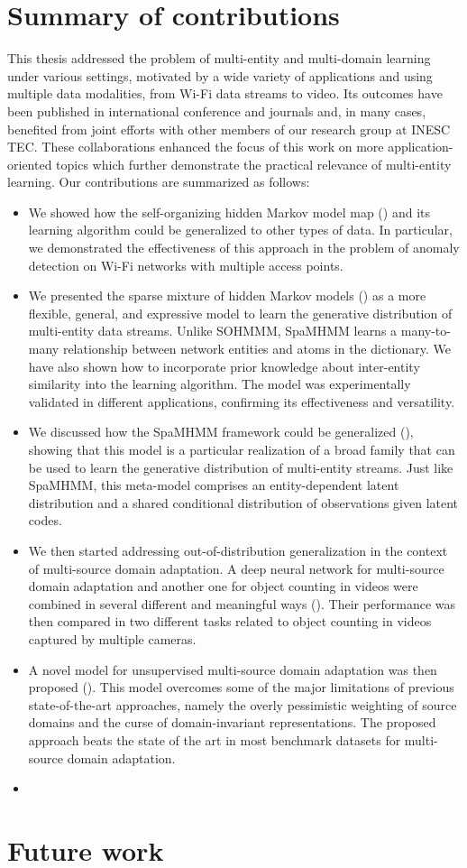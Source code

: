 \section{Summary of contributions}
This thesis addressed the problem of multi-entity and multi-domain learning under various settings, motivated by a wide variety of applications and using multiple data modalities, from Wi-Fi data streams to video. Its outcomes have been published in international conference and journals and, in many cases, benefited from joint efforts with other members of our research group at INESC TEC. These collaborations enhanced the focus of this work on more application-oriented topics which further demonstrate the practical relevance of multi-entity learning. Our contributions are summarized as follows:
\begin{itemize}
    \item We showed how the self-organizing hidden Markov model map () and its learning algorithm could be generalized to other types of data. In particular, we demonstrated the effectiveness of this approach in the problem of anomaly detection on Wi-Fi networks with multiple access points.
    \item We presented the sparse mixture of hidden Markov models () as a more flexible, general, and expressive model to learn the generative distribution of multi-entity data streams. Unlike SOHMMM, SpaMHMM learns a many-to-many relationship between network entities and atoms in the dictionary. We have also shown how to incorporate prior knowledge about inter-entity similarity into the learning algorithm. The model was experimentally validated in different applications, confirming its effectiveness and versatility.
    \item We discussed how the SpaMHMM framework could be generalized (), showing that this model is a particular realization of a broad family that can be used to learn the generative distribution of multi-entity streams. Just like SpaMHMM, this meta-model comprises an entity-dependent latent distribution and a shared conditional distribution of observations given latent codes.
    \item We then started addressing out-of-distribution generalization in the context of multi-source domain adaptation. A deep neural network for multi-source domain adaptation and another one for object counting in videos were combined in several different and meaningful ways (). Their performance was then compared in two different tasks related to object counting in videos captured by multiple cameras.
    \item A novel model for unsupervised multi-source domain adaptation was then proposed (). This model overcomes some of the major limitations of previous state-of-the-art approaches, namely the overly pessimistic weighting of source domains and the curse of domain-invariant representations. The proposed approach beats the state of the art in most benchmark datasets for multi-source domain adaptation.
    \item
\end{itemize}

\section{Future work}
